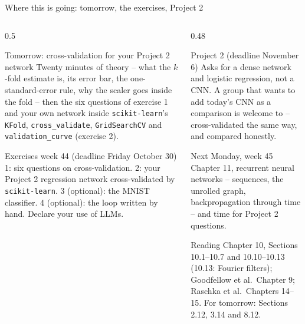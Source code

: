 \documentclass[10pt,aspectratio=169]{beamer}
\begin{document}
\begin{frame}{Where this is going: tomorrow, the exercises, Project 2}
\small
\begin{columns}[T]
\begin{column}{0.5\textwidth}
\begin{block}{Tomorrow: cross-validation for your Project 2 network}
Twenty minutes of theory -- what the $k$-fold estimate is, its error bar,
the one-standard-error rule, why the scaler goes inside the fold -- then
the six questions of exercise 1 and your own network inside
\texttt{scikit-learn}'s \texttt{KFold}, \texttt{cross\_validate},
\texttt{GridSearchCV} and \texttt{validation\_curve} (exercise 2).
\end{block}
\begin{block}{Exercises week 44 (deadline Friday October 30)}
1: six questions on cross-validation.  2: your Project 2 regression
network cross-validated by \texttt{scikit-learn}.  3 (optional): the
MNIST classifier.  4 (optional): the loop written by hand.  Declare your
use of LLMs.
\end{block}
\end{column}
\begin{column}{0.48\textwidth}
\begin{block}{Project 2 (deadline November 6)}
Asks for a dense network and logistic regression, not a CNN.  A group that
wants to add today's CNN as a comparison is welcome to -- cross-validated
the same way, and compared honestly.
\end{block}
\begin{block}{Next Monday, week 45}
Chapter 11, recurrent neural networks -- sequences, the unrolled graph,
backpropagation through time -- and time for Project 2 questions.
\end{block}
\begin{block}{Reading}
Chapter 10, Sections 10.1--10.7 and 10.10--10.13 (10.13: Fourier
filters); Goodfellow et al.\ Chapter 9; Raschka et al.\ Chapters 14--15.
For tomorrow: Sections 2.12, 3.14 and 8.12.
\end{block}
\end{column}
\end{columns}
\end{frame}
\end{document}
